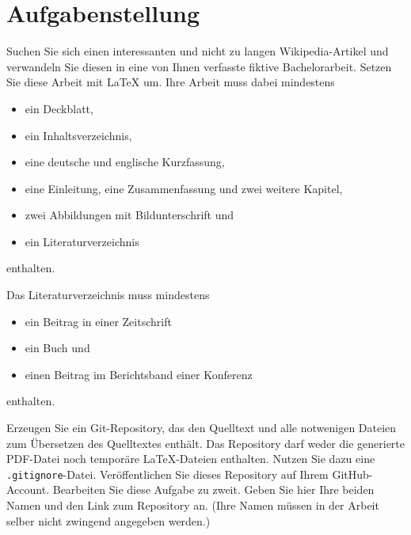 \cleardoublepage


\section*{Aufgabenstellung}

Suchen Sie sich einen interessanten und nicht zu langen Wikipedia-Artikel und verwandeln Sie diesen in 
eine von Ihnen verfasste fiktive Bachelorarbeit. Setzen Sie diese Arbeit mit LaTeX um. Ihre Arbeit muss 
dabei mindestens

\begin{itemize}
    \item ein Deckblatt,
    \item ein Inhaltsverzeichnis,
    \item eine deutsche und englische Kurzfassung,
    \item eine Einleitung, eine Zusammenfassung und zwei weitere Kapitel,
    \item zwei Abbildungen mit Bildunterschrift und
    \item ein Literaturverzeichnis
\end{itemize}

enthalten.

Das Literaturverzeichnis muss mindestens

\begin{itemize}
    \item ein Beitrag in einer Zeitschrift
    \item ein Buch und
    \item einen Beitrag im Berichtsband einer Konferenz
\end{itemize}

enthalten.

Erzeugen Sie ein Git-Repository, das den Quelltext und alle notwenigen Dateien zum Übersetzen des Quelltextes enthält. Das Repository darf weder die generierte PDF-Datei noch temporäre LaTeX-Dateien enthalten. Nutzen Sie dazu eine \texttt{.gitignore}-Datei. Veröffentlichen Sie dieses Repository auf Ihrem GitHub-Account. Bearbeiten Sie diese Aufgabe zu zweit. Geben Sie hier Ihre beiden Namen und den Link zum Repository an. (Ihre Namen müssen in der Arbeit selber nicht zwingend angegeben werden.)